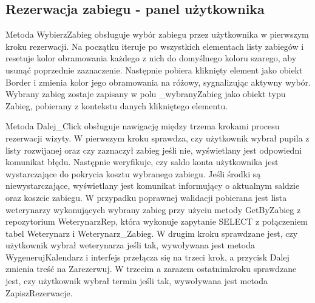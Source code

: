 

\subsection{Rezerwacja zabiegu - panel użytkownika}

Metoda WybierzZabieg obsługuje wybór zabiegu przez użytkownika w pierwszym kroku rezerwacji. 
Na początku iteruje po wszystkich elementach listy zabiegów i resetuje kolor obramowania każdego z nich do 
domyślnego koloru szarego, aby usunąć poprzednie zaznaczenie. Następnie pobiera kliknięty element jako obiekt Border i zmienia 
kolor jego obramowania na różowy, sygnalizując aktywny wybór. Wybrany zabieg zostaje zapisany w polu \_wybranyZabieg
jako obiekt typu Zabieg, pobierany z kontekstu danych klikniętego elementu.



Metoda Dalej\_Click obsługuje nawigację między trzema krokami procesu rezerwacji wizyty. W pierwszym kroku sprawdza, czy 
użytkownik wybrał pupila z listy rozwijanej oraz czy zaznaczył zabieg jeśli nie, wyświetlany jest odpowiedni komunikat błędu. 
Następnie weryfikuje, czy saldo konta użytkownika jest wystarczające do pokrycia kosztu wybranego zabiegu. Jeśli środki są niewystarczające,
wyświetlany jest komunikat informujący o aktualnym saldzie oraz koszcie zabiegu. W przypadku poprawnej walidacji pobierana jest lista weterynarzy 
wykonujących wybrany zabieg przy użyciu metody GetByZabieg z repozytorium WeterynarzRep, która wykonuje zapytanie SELECT z 
połączeniem tabel Weterynarz i Weterynarz\_Zabieg. W drugim kroku sprawdzane jest, czy 
użytkownik wybrał weterynarza jeśli tak, wywoływana jest metoda WygenerujKalendarz i interfejs przełącza się na trzeci krok, a przycisk Dalej
zmienia treść na Zarezerwuj. W trzecim a zarazem ostatnimkroku sprawdzane jest, czy użytkownik wybrał termin jeśli tak, wywoływana jest metoda ZapiszRezerwacje.



